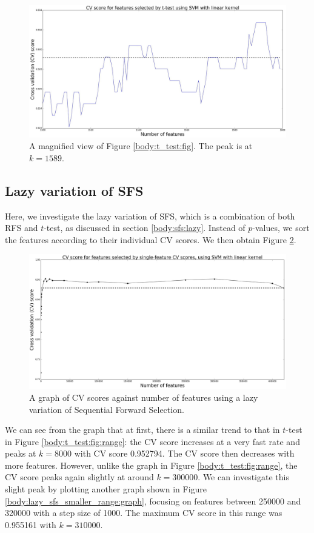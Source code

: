 \documentclass[12pt, twoside, a4paper]{report}
\begin{document}
\begin{figure}
\centering
\includegraphics[width=\textwidth]{images/t_test_2000_uneq_var_zoom.jpeg}
\caption{A magnified view of Figure \ref{body:t_test:fig}. The peak is at $k=1589$.}
\label{body:t_test:fig_zoom}
\end{figure}

\subsection{Lazy variation of SFS}
Here, we investigate the lazy variation of SFS, which is a combination of both RFS and $t$-test, as discussed in section \ref{body:sfs:lazy}. Instead of $p$-values, we sort the features according to their individual CV scores. We then obtain Figure \ref{body:lazy_sfs:graph}. 

\begin{figure}
\centering
\includegraphics[width=\textwidth]{images/lazy_sfs_range.jpeg}
\caption{A graph of CV scores against number of features using a lazy variation of Sequential Forward Selection.}
\label{body:lazy_sfs:graph}
\end{figure}

We can see from the graph that at first, there is a similar trend to that in $t$-test in Figure \ref{body:t_test:fig:range}: the CV score increases at a very fast rate and peaks at $k=8000$ with CV score 0.952794.  The CV score then decreases with more features. However, unlike the graph in Figure \ref{body:t_test:fig:range}, the CV score peaks again slightly at around $k=300000$. We can investigate this slight peak by plotting another graph shown in Figure \ref{body:lazy_sfs_smaller_range:graph}, focusing on features between 250000 and 320000 with a step size of 1000. The maximum CV score in this range was 0.955161 with $k=310000$.
\end{document}
